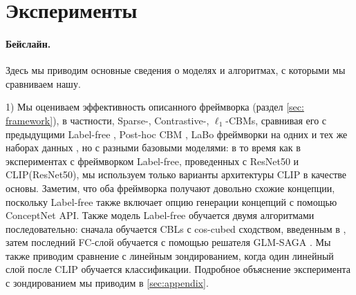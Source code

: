 \section{Эксперименты}\label{sec:exps}

\paragraph{Бейслайн.} Здесь мы приводим основные сведения о моделях и алгоритмах, с которыми мы сравниваем нашу.

1) Мы оцениваем эффективность описанного фреймворка (раздел \ref{sec: framework}), в частности, Sparse-, Contrastive-, $\ell_1$-CBMs, сравнивая его с предыдущими Label-free \cite{oikarinen2023labelfree}, Post-hoc CBM \cite{yuksekgonul2023posthoc}, LaBo \cite{yang2023language} фреймворки на одних и тех же наборах данных \cite{5206848,wah_branson_welinder_perona_belongie_2011,krizhevsky2009learning,7968387}, но с разными базовыми моделями: в то время как в экспериментах с фреймворком Label-free, проведенных с ResNet50 \cite{he2015deep} и CLIP(ResNet50)\cite{radford2021learning}, мы используем только варианты архитектуры CLIP в качестве основы. Заметим, что оба фреймворка получают довольно схожие концепции, поскольку Label-free также включает опцию генерации концепций с помощью ConceptNet API. Также модель Label-free обучается двумя алгоритмами последовательно: сначала обучается CBLs с cos-cubed сходством, введенным в \cite{oikarinen2023labelfree}, затем последний FC-слой обучается с помощью решателя GLM-SAGA \cite{pmlr-v139-wong21b}. Мы также приводим сравнение с линейным зондированием, когда один линейный слой после CLIP обучается классификации. Подробное объяснение эксперимента с зондированием мы приводим в \cref{sec:appendix}.

